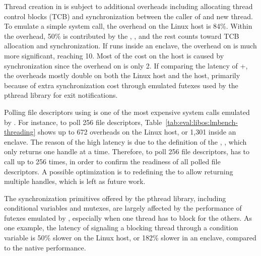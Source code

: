 \label{sec:eval:libos:threading}


\begin{table}[t!b!]

\caption{Performance of threading and scheduling operations, including cloning a thread, polling file descriptors, and synchronization primitives (signaling a conditional variable, acquiring a mutex). Comparison is among (1) native Linux processes; (2) \graphene{} on Linux host, both without and with \seccomp{} filter ({\bf +SC}) and reference monitor ({\bf +RM}); (3) \graphenesgx{}.
System call latency is in microseconds, and lower is better.
Overheads are relative to Linux; negative overheads indicate improvement.} 
\label{tab:eval:libos:lmbench-threading}
\end{table}


Thread creation in \thelibos{}
is subject to additional overheads including allocating thread control blocks (TCB)
and synchronization between the caller of  and new thread.
To emulate a simple  system call, the overhead on the Linux host is \roughly{}84\%.
Within the overhead, 50\% is contributed
by the \hostapi{}, , and the rest counts toward
TCB allocation and synchronization.
If \thelibos{} runs inside an enclave,
the overhead on  is much more significant, reaching \roughly{}10\x{}.
Most of the cost on the \sgx{} host
is caused by synchronization since the overhead on  is only 2\x{}.
If comparing the latency of +, the overheads mostly double on both the Linux host and the \sgx{} host,
primarily because of extra synchronization cost
through emulated futexes
used by the pthread library for exit notifications.



Polling file descriptors using  is one of the most expensive system calls
emulated by \thelibos{}.
For instance, to poll 256 file descriptors,
Table~\ref{tab:eval:libos:lmbench-threading} shows up to 672\x{} overheads on the Linux host, or 1,301\x{} inside an enclave.
The reason of the high latency
is due to the definition of the \hostapi{}, ,
which only returns one handle at a time.
Therefore, to poll 256 file descriptors,
\thelibos{} has to call  up to 256 times, in order to confirm
the readiness of all polled file descriptors.
A possible optimization
is to redefining the \hostapi{} to allow returning multiple handles,
which is left as future work.


The synchronization primitives offered by the pthread library,
including conditional variables and mutexes, 
are largely affected by the performance of futexes emulated by \thelibos{},
especially when one thread has to block for the others.
As one example,
the latency of signaling a blocking thread
through a condition variable
is 50\% slower on the Linux host, or 182\% slower in an enclave,
compared to the native performance.





